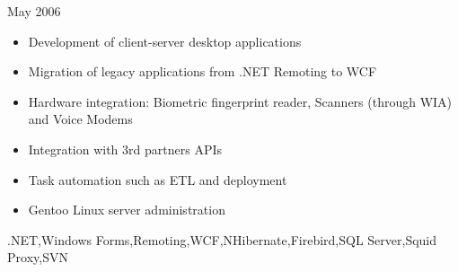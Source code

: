 \begin{experiences}
    {May 2006}     {
                     \begin{itemize}
                       \item Development of client-server desktop applications
                       \item Migration of legacy applications from .NET Remoting to WCF
                       \item Hardware integration: Biometric fingerprint reader, Scanners (through WIA) and Voice Modems
                       \item Integration with 3rd partners APIs
                       \item Task automation such as ETL and deployment
                       \item Gentoo Linux server administration
                     \end{itemize}
                   }
                   {.NET,Windows Forms,Remoting,WCF,NHibernate,Firebird,SQL Server,Squid Proxy,SVN}
\end{experiences}